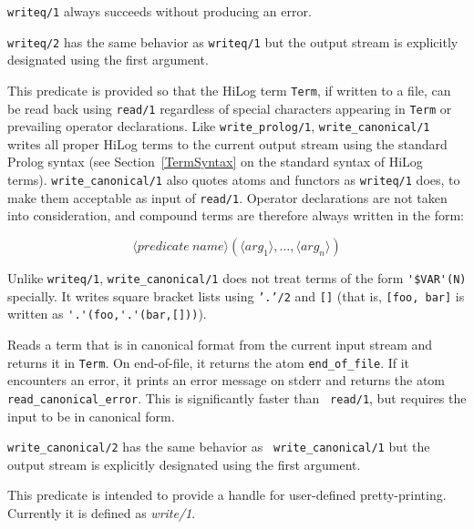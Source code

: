 \begin{description}
    {\tt writeq/1} always succeeds without producing an error.

	{\tt writeq/2} has the same behavior as {\tt writeq/1} but the
	output stream is explicitly designated using the first argument.

    This predicate is provided so that the HiLog term {\tt Term}, 
    if written to a file, can be read back using {\tt read/1} regardless of 
    special characters appearing in {\tt Term} or prevailing operator 
    declarations. Like {\tt write\_prolog/1}, {\tt write\_canonical/1} 
    writes all proper HiLog terms to the current output stream using the 
    standard Prolog syntax (see Section~\ref{TermSyntax} on the standard 
    syntax of HiLog terms). {\tt write\_canonical/1} also quotes atoms and 
    functors as {\tt writeq/1} does, to make them acceptable as input of 
    {\tt read/1}\@.  Operator declarations are not taken into consideration,
    and compound terms are therefore always written in the form:

		\[ \langle predicate\ name \rangle
			(\langle arg_1 \rangle, \ldots,
			 \langle arg_n \rangle) \]

    Unlike {\tt writeq/1}, {\tt write\_canonical/1} does not treat terms 
    of the form \verb|'$VAR'(N)| specially. It writes square bracket lists 
    using {\tt '.'/2} and {\tt []} (that is, {\tt [foo, bar]} is written 
    as \verb|'.'(foo,'.'(bar,[]))|).

  
Reads a term that is in canonical format from the
current input stream and returns it in {\tt Term}. On end-of-file, it
returns the atom {\tt end\_of\_file}.  If it encounters an error, it
prints an error message on stderr and returns the atom {\tt
read\_canonical\_error}. This is significantly faster than {\tt
read/1}, but requires the input to be in canonical form.

	{\tt write\_canonical/2} has the same behavior as {\tt
	write\_canonical/1} but the output stream is explicitly
	designated using the first argument.

    This predicate is intended to provide a handle for user-defined 
    pretty-printing.  Currently it is defined as {\em write/1}.

\end{description}

